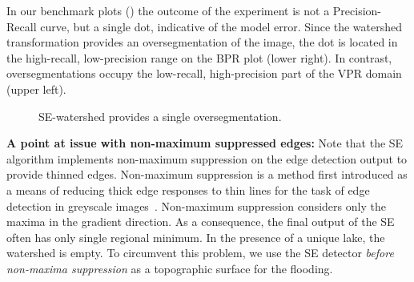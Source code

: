 In our benchmark plots () the outcome of the experiment is not a Precision-Recall curve, but a single dot, indicative of the model error. Since the watershed transformation provides an oversegmentation of the image, the dot is located in the high-recall, low-precision range on the BPR plot (lower right). In contrast, oversegmentations occupy the low-recall, high-precision part of the VPR domain (upper left). 

\begin{figure}[ht!]
\centering
\caption[SE-watershed plots]{SE-watershed provides a single oversegmentation.}
\label{fig:SE-watershed}
\end{figure}


\textbf{A point at issue %
with non-maximum suppressed edges:} Note that the SE algorithm implements non-maximum suppression on the edge detection output to provide thinned edges. Non-maximum suppression is a method first introduced as a means of reducing thick edge responses to thin lines for the task of edge detection in greyscale images~\cite{rosenfeld1976digital}. Non-maximum suppression considers only the maxima in the gradient direction. As a consequence, the final output of the SE often has only single regional minimum. In the presence of a unique lake, the watershed is empty. To circumvent this problem, we use the SE detector \textit{before non-maxima suppression} as a topographic surface for the flooding.

